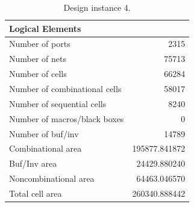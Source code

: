 \begin{frame}
\begin{columns}[t,onlytextwidth]
\begin{column}{0.45\linewidth}
\begin{table}[t!]
{			\begin{tabular}{@{}lr@{}}\\
				Logical Elements\\
				\hline\hline
				Number of ports                &2315\\
				Number of nets                 &75713\\
				Number of cells                &66284\\
				Number of combinational cells  &58017\\
				Number of sequential cells     &8240\\
				Number of macros/black boxes   &0\\
				Number of buf/inv              &14789\\
				\hline
				Combinational area             &195877.841872\\
				Buf/Inv area                   &24429.880240\\
				Noncombinational area          &64463.046570\\
				\hline
				Total cell area                &260340.888442\\	
				\hline
			\end{tabular}}
			\caption{\footnotesize Design instance 4.}			
			\end{table}
   		\end{column}   		
	\end{columns}  
\end{frame}

